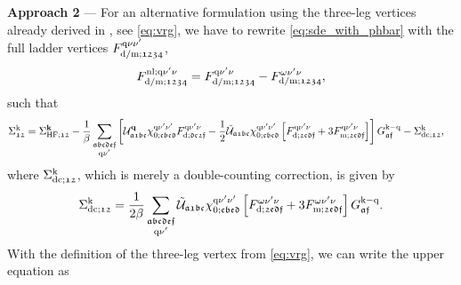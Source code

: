 \documentclass[../../main.tex]{subfiles}
\begin{document}
\\\\
\textbf{Approach 2} --- For an alternative formulation using the three-leg vertices already derived in , see \eqref{eq:vrg}, we have to rewrite \eqref{eq:sde_with_phbar} with the full ladder vertices $F^{\text{q}\nu\nu'}_{\text{d}/\text{m};\mathfrak{1234}}$,
\begin{align}
	F^{\text{nl};\text{q}\nu'\nu}_{\text{d}/\text{m};\mathfrak{1234}}=F^{\text{q}\nu'\nu}_{\text{d}/\text{m};\mathfrak{1234}}-F^{\omega\nu'\nu}_{\text{d}/\text{m};\mathfrak{1234}},
\end{align}
such that
\begin{align}
	\Sigma^{\text{k}}_{\mathfrak{12}}&=\Sigma_{\text{HF};\mathfrak{12}}^{\textbf{k}} -\frac1\beta\sum_{\substack{\mathfrak{abcdef}\\\text{q}\nu'}}\left [\mathcal{U}^{\textbf{q}}_{\mathfrak{a1bc}}\chi^{\text{q}\nu'\nu'}_{0;\mathfrak{cbed}} F^{\text{q}\nu'\nu}_{\text{d};\mathfrak{de2f}}-\frac12\tilde{\mathcal{U}}_{\mathfrak{a1bc}}\chi^{\text{q}\nu'\nu'}_{0;\mathfrak{cbed}}\left [F^{\text{q}\nu'\nu}_{\text{d};\mathfrak{2edf}}+3 F^{\text{q}\nu'\nu}_{\text{m};\mathfrak{2edf}}\right ]\right ]G_{\mathfrak{af}}^{\text{k}-\text{q}} - \Sigma^{\text{k}}_{\text{dc};\mathfrak{12}},
\end{align}
where $\Sigma^{\text{k}}_{\text{dc};\mathfrak{12}}$, which is merely a double-counting correction, is given by
\begin{align}\label{eq:sigma_double_counting}
	\Sigma^{\text{k}}_{\text{dc};\mathfrak{12}} = \frac{1}{2\beta}\sum_{\substack{\mathfrak{abcdef}\\\text{q}\nu'}}\tilde{\mathcal{U}}_{\mathfrak{a1bc}}\chi^{\text{q}\nu'\nu'}_{0;\mathfrak{cbed}}\left [F^{\omega\nu'\nu}_{\text{d};\mathfrak{2edf}}+3 F^{\omega\nu'\nu}_{\text{m};\mathfrak{2edf}}\right ]G_{\mathfrak{af}}^{\text{k}-\text{q}}.
\end{align}
With the definition of the three-leg vertex from \eqref{eq:vrg}, we can write the upper equation as
\end{document}
